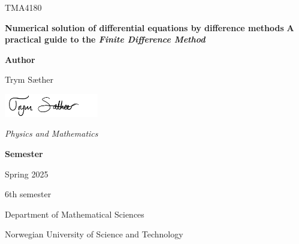 \begin{titlepage}
    {\color{ntnu-blue}\sffamily\Large TMA4180 \par}
    {\sffamily\large\bfseries\color{black} Numerical solution of differential equations by difference methods}
    \vspace{0.5cm}  %
    {\color{ntnu-lightblue}\HRule}
    {\color{ntnu-blue}\sffamily\LARGE \textbf{A practical guide to the \textit{Finite Difference Method}}}
    {\color{ntnu-lightblue}\HRule}
\vfill
    \begin{minipage}{0.60\textwidth}
        \begin{flushleft}
            \large
            {\color{ntnu-blue}\textbf{Author}}\par
            \vspace{0.15cm}  %
            Trym Sæther\par
            \vspace{0.2cm}  %
            \includegraphics[height=1cm]{frontmatter/TS_Signature.png}\par
            \vspace{0.2cm}  %
            {\color{ntnu-purple}\textit{Physics and Mathematics}}\par
        \end{flushleft}
    \end{minipage}
    \hfill
    \begin{minipage}{0.35\textwidth}
        \begin{flushright}
            \large
            {\color{ntnu-blue}\textbf{Semester}}\par
            \vspace{0.15cm}  %
            Spring 2025\par
            6th semester
        \end{flushright}
    \end{minipage}
    \vfill  %
    {\sffamily Department of Mathematical Sciences} \par
    {\color{ntnu-blue}\sffamily Norwegian University of Science and Technology}
\end{titlepage}

